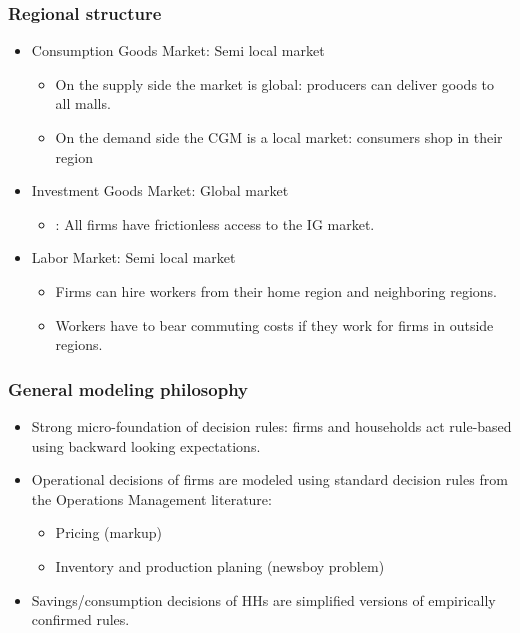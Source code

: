 \documentclass{beamer}
\begin{document}
\frame
{
  \frametitle{Regional structure} 
\begin{itemize}
	\item Consumption Goods Market: Semi local market
	
\begin{itemize}
	\item On the supply side the market is global: producers can deliver goods
to all malls.
	\item On the demand side the CGM is a local market: consumers shop in their region
\end{itemize}

\item Investment Goods Market: Global market
\begin{itemize}
	\item : All firms have frictionless access to the IG market.
\end{itemize}
\item Labor Market: Semi local market
\begin{itemize}
	\item Firms can hire workers from their home region and neighboring regions.
	\item Workers have to bear commuting costs if they work for firms in outside regions. 
\end{itemize}


	
\end{itemize}
	

}






\frame
{
  \frametitle{General modeling philosophy} 
\begin{itemize}
\item Strong micro-foundation of decision rules:
 firms and households act rule-based using backward looking expectations. 

\item Operational decisions of firms are modeled using standard decision rules from the Operations Management literature: 
\begin{itemize}
	\item Pricing (markup)
\item Inventory and production planing (newsboy problem)
\end{itemize}

\item Savings/consumption decisions of HHs are simplified versions of empirically confirmed rules.

	
\end{itemize}


}
\end{document}
